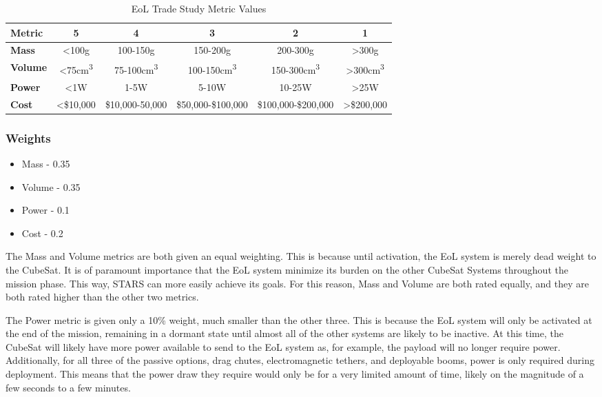 \begin{table}[H]
\centering
\begin{tabular}{|l|c|c|c|c|c|} 
\hline
    \textbf{Metric} & \textbf{5} & \textbf{4} & \textbf{3} & \textbf{2} & \textbf{1}
    \\
\hline
    \textbf{Mass} & <100g & 100-150g & 150-200g & 200-300g & >300g 
    \\
\hline
    \textbf{Volume} & <75cm\textsuperscript{3} & 75-100cm\textsuperscript{3} & 100-150cm\textsuperscript{3} & 150-300cm\textsuperscript{3} & >300cm\textsuperscript{3} 
    \\
\hline
    \textbf{Power} & <1W & 1-5W & 5-10W & 10-25W & >25W 
    \\
\hline
    \textbf{Cost} & <\$10,000 & \$10,000-50,000 & \$50,000-\$100,000 & \$100,000-\$200,000 & >\$200,000 
    \\

\hline
\end{tabular}
\caption{EoL Trade Study Metric Values}
\label{tbl:EoL_Metric_Scores}
\end{table}
\subsubsection{Weights}
\begin{itemize}
    \item Mass - 0.35
    \item Volume - 0.35
    \item Power - 0.1
    \item Cost - 0.2
\end{itemize}

The Mass and Volume metrics are both given an equal weighting. This is because until activation, the EoL system is merely dead weight to the CubeSat. It is of paramount importance that the EoL system minimize its burden on the other CubeSat Systems throughout the mission phase. This way, STARS can more easily achieve its goals. For this reason, Mass and Volume are both rated equally, and they are both rated higher than the other two metrics. 

The Power metric is given only a 10\% weight, much smaller than the other three. This is because the EoL system will only be activated at the end of the mission, remaining in a dormant state until almost all of the other systems are likely to be inactive. At this time, the CubeSat will likely have more power available to send to the EoL system as, for example, the payload will no longer require power. Additionally, for all three of the passive options, drag chutes, electromagnetic tethers, and deployable booms, power is only required during deployment. This means that the power draw they require would only be for a very limited amount of time, likely on the magnitude of a few seconds to a few minutes. 

